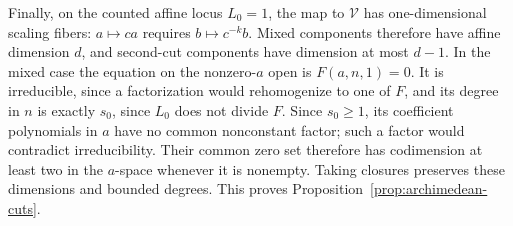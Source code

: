 Finally, on the counted affine locus \(L_0=1\), the map to
\(\mathcal V\) has one-dimensional scaling fibers:
\(a\mapsto ca\) requires \(b\mapsto c^{-k}b\).
Mixed components therefore have affine dimension \(d\), and
second-cut components have dimension at most \(d-1\).
In the mixed case the equation on the nonzero-\(a\) open is
\(F(a,n,1)=0\).  It is irreducible, since a factorization would
rehomogenize to one of \(F\), and its degree in \(n\) is exactly
\(s_0\), since \(L_0\) does not divide \(F\).
Since \(s_0\geq1\), its coefficient polynomials in \(a\) have no
common nonconstant factor; such a factor would contradict
irreducibility.  Their common zero set therefore has codimension
at least two in the \(a\)-space whenever it is nonempty.
Taking closures preserves these dimensions and bounded degrees.
This proves Proposition~\ref{prop:archimedean-cuts}.

